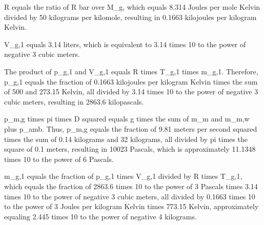 R equals the ratio of R bar over M_g, which equals 8.314 Joules per mole Kelvin divided by 50 kilograms per kilomole, resulting in 0.1663 kilojoules per kilogram Kelvin.

V_g,1 equals 3.14 liters, which is equivalent to 3.14 times 10 to the power of negative 3 cubic meters.

The product of p_g,1 and V_g,1 equals R times T_g,1 times m_g,1. Therefore, p_g,1 equals the fraction of 0.1663 kilojoules per kilogram Kelvin times the sum of 500 and 273.15 Kelvin, all divided by 3.14 times 10 to the power of negative 3 cubic meters, resulting in 2863.6 kilopascals.

p_m,g times pi times D squared equals g times the sum of m_m and m_m,w plus p_amb. Thus, p_m,g equals the fraction of 9.81 meters per second squared times the sum of 0.14 kilograms and 32 kilograms, all divided by pi times the square of 0.1 meters, resulting in 10023 Pascals, which is approximately 11.1348 times 10 to the power of 6 Pascals.

m_g,1 equals the fraction of p_g,1 times V_g,1 divided by R times T_g,1, which equals the fraction of 2863.6 times 10 to the power of 3 Pascals times 3.14 times 10 to the power of negative 3 cubic meters, all divided by 0.1663 times 10 to the power of 3 Joules per kilogram Kelvin times 773.15 Kelvin, approximately equaling 2.445 times 10 to the power of negative 4 kilograms.